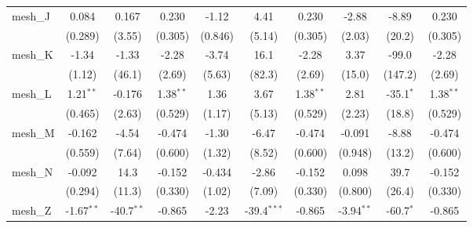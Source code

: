\begin{tabular}{lccccccccc}
   mesh\_J                                                     & 0.084          & 0.167          & 0.230          & -1.12          & 4.41          & 0.230          & -2.88          & -8.89          & 0.230\\   
                                                               & (0.289)        & (3.55)         & (0.305)        & (0.846)        & (5.14)        & (0.305)        & (2.03)         & (20.2)         & (0.305)\\   
   mesh\_K                                                     & -1.34          & -1.33          & -2.28          & -3.74          & 16.1          & -2.28          & 3.37           & -99.0          & -2.28\\   
                                                               & (1.12)         & (46.1)         & (2.69)         & (5.63)         & (82.3)        & (2.69)         & (15.0)         & (147.2)        & (2.69)\\   
   mesh\_L                                                     & 1.21$^{**}$    & -0.176         & 1.38$^{**}$    & 1.36           & 3.67          & 1.38$^{**}$    & 2.81           & -35.1$^{*}$    & 1.38$^{**}$\\   
                                                               & (0.465)        & (2.63)         & (0.529)        & (1.17)         & (5.13)        & (0.529)        & (2.23)         & (18.8)         & (0.529)\\   
   mesh\_M                                                     & -0.162         & -4.54          & -0.474         & -1.30          & -6.47         & -0.474         & -0.091         & -8.88          & -0.474\\   
                                                               & (0.559)        & (7.64)         & (0.600)        & (1.32)         & (8.52)        & (0.600)        & (0.948)        & (13.2)         & (0.600)\\   
   mesh\_N                                                     & -0.092         & 14.3           & -0.152         & -0.434         & -2.86         & -0.152         & 0.098          & 39.7           & -0.152\\   
                                                               & (0.294)        & (11.3)         & (0.330)        & (1.02)         & (7.09)        & (0.330)        & (0.800)        & (26.4)         & (0.330)\\   
   mesh\_Z                                                     & -1.67$^{**}$   & -40.7$^{**}$   & -0.865         & -2.23          & -39.4$^{***}$ & -0.865         & -3.94$^{**}$   & -60.7$^{*}$    & -0.865\\   

\end{tabular}
